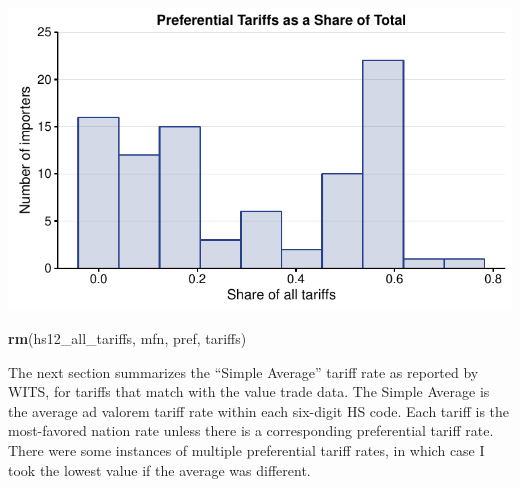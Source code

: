 \documentclass[10pt,]{article}
\newenvironment{Shaded}{\begin{snugshade}}{\end{snugshade}}
\newcommand{\KeywordTok}[1]{\textcolor[rgb]{0.13,0.29,0.53}{\textbf{{#1}}}}
\newcommand{\NormalTok}[1]{{#1}}
\begin{document}
\begin{center}\includegraphics{Figs/pref_summary-1} \end{center}

\begin{Shaded}
\begin{Highlighting}[]
\KeywordTok{rm}\NormalTok{(hs12_all_tariffs, mfn, pref, tariffs)}
\end{Highlighting}
\end{Shaded}

The next section summarizes the ``Simple Average'' tariff rate as
reported by WITS, for tariffs that match with the value trade data. The
Simple Average is the average ad valorem tariff rate within each
six-digit HS code. Each tariff is the most-favored nation rate unless
there is a corresponding preferential tariff rate. There were some
instances of multiple preferential tariff rates, in which case I took
the lowest value if the average was different.
\end{document}
